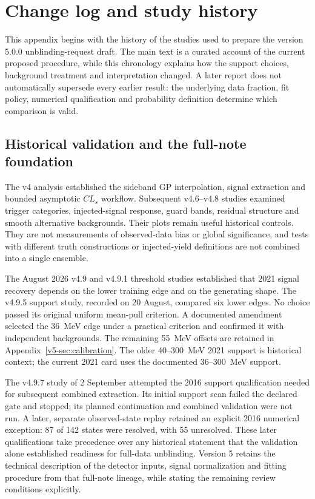 \section{Change log and study history}
\label{v5-sec:history}\label{sec:v5-history}
This appendix begins with the history of the studies used to prepare the
version 5.0.0 unblinding-request draft. The main text is a curated account
of the current proposed procedure, while this chronology explains how the
support choices, background treatment and interpretation changed.
A later report does not automatically supersede every earlier result:
the underlying data fraction, fit policy, numerical qualification and
probability definition determine which comparison is valid.

\subsection{Historical validation and the full-note foundation}
The v4 analysis established the sideband GP interpolation, signal
extraction and bounded asymptotic $CL_s$ workflow. Subsequent v4.6--v4.8
studies examined trigger categories, injected-signal response, guard bands,
residual structure and smooth alternative backgrounds. Their plots remain
useful historical controls. They are not measurements of observed-data
bias or global significance, and tests with different truth constructions
or injected-yield definitions are not combined into a single ensemble.

The August 2026 v4.9 and v4.9.1 threshold studies established that 2021
signal recovery depends on the lower training edge and on the generating
shape. The v4.9.5 support study, recorded on 20 August, compared six
lower edges. No choice passed its original uniform mean-pull criterion.
A documented amendment selected the 36~MeV edge under a practical
criterion and confirmed it with independent backgrounds. The remaining
55~MeV offsets are retained in Appendix~\ref{v5-sec:calibration}.
The older 40--300~MeV 2021 support is historical context; the current
2021 card uses the documented 36--300~MeV support.

The v4.9.7 study of 2 September attempted the 2016 support qualification
needed for subsequent combined extraction. Its initial support scan failed
the declared gate and stopped; its planned continuation and combined
validation were not run. A later, separate observed-state replay retained
an explicit 2016 numerical exception: 87 of 142 states were resolved,
with 55 unresolved. These later qualifications take precedence over any
historical statement that the validation alone established readiness for
full-data unblinding. Version 5 retains the technical description of the
detector inputs, signal normalization and fitting procedure from that
full-note lineage, while stating the remaining review conditions explicitly.

